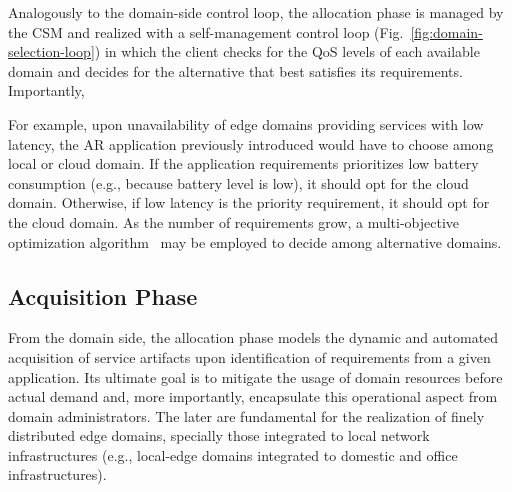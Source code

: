 Analogously to the domain-side control loop, the allocation phase is managed by the CSM  and realized with a self-management control loop (Fig.~\ref{fig:domain-selection-loop}) in which the client checks for the QoS levels of each available domain and decides for the alternative that best satisfies its requirements. Importantly, 

For example, upon unavailability of edge domains providing services with low latency, the AR application previously introduced would have to choose among local or cloud domain. If the application requirements prioritizes low battery consumption (e.g., because battery level is low), it should opt for the cloud domain. Otherwise, if low latency is the priority requirement, it should opt for the cloud domain. As the number of requirements grow, a multi-objective optimization algorithm~\cite{Olson1996} may be employed to decide among alternative domains.






\subsection{Acquisition Phase}\label{sec:A3-E-acquisition}


From the domain side, the allocation phase models the dynamic and automated acquisition of service artifacts upon identification of requirements from a given application. Its ultimate goal is to mitigate the usage of domain resources before actual demand and, more importantly, encapsulate this operational aspect from domain administrators. The later are fundamental for the realization of finely distributed edge domains, specially those integrated to local network infrastructures (e.g., local-edge domains integrated to domestic and office infrastructures).

